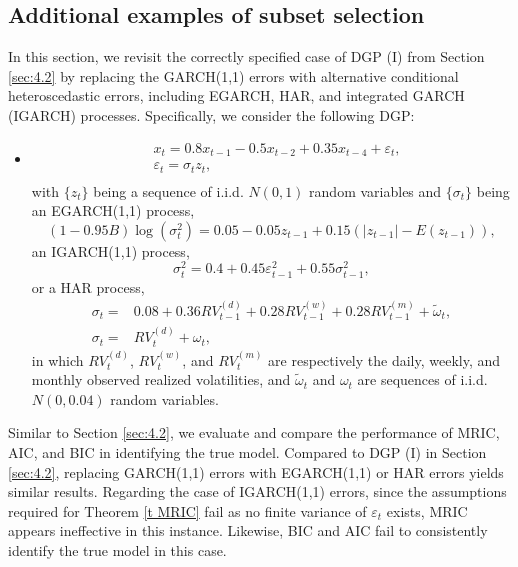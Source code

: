 \documentclass[ejsv2]{imsart}
\theoremstyle{plain}
\theoremstyle{definition}
\theoremstyle{remark}
\begin{document}
\subsection{Additional examples of subset selection}\label{sec:add sub sel}
In this section, we revisit the correctly specified case of DGP (I) from Section \ref{sec:4.2} by replacing the GARCH(1,1) errors with alternative conditional heteroscedastic errors, including EGARCH, HAR, and integrated GARCH (IGARCH) processes. Specifically, we consider the following DGP:
\begin{itemize}
  \item [(III)]
  \begin{equation*}%
\begin{split}
     & x_t=0.8x_{t-1}-0.5x_{t-2}+0.35x_{t-4}+\varepsilon_t, \\
     & \varepsilon_t=\sigma_tz_t,  \\
\end{split}
\end{equation*}
with $\{z_t\}$ being a sequence of
i.i.d. $N(0,1)$ random variables
and $\{\sigma_t\}$ being an EGARCH(1,1) process,
\begin{equation*}
(1-0.95B)\log(\sigma_t^2)=0.05-0.05z_{t-1}+0.15(|z_{t-1}|-E(z_{t-1})),
\end{equation*}
an IGARCH(1,1) process,
\begin{equation*}
\sigma_t^2=0.4+0.45\varepsilon_{t-1}^2+0.55\sigma_{t-1}^2,
\end{equation*}
or a HAR process,
\begin{equation*}
\begin{split}
   \sigma_t= & 0.08+0.36RV^{(d)}_{t-1}+0.28RV_{t-1}^{(w)}+0.28RV_{t-1}^{(m)}+\tilde{\omega}_{t}, \\
   \sigma_t= & RV^{(d)}_{t}+{\omega}_{t},
\end{split}
\end{equation*}
in which $RV^{(d)}_{t}$, $RV_{t}^{(w)}$, and $RV_{t}^{(m)}$ are respectively the daily, weekly, and monthly observed realized volatilities, and $\tilde{\omega}_{t}$ and ${\omega}_{t}$ are sequences of i.i.d. $N(0,0.04)$ random variables.
\end{itemize}

Similar to Section \ref{sec:4.2}, we evaluate and compare the performance of MRIC, AIC, and BIC in identifying the true model. Compared to DGP (I) in Section \ref{sec:4.2}, replacing GARCH(1,1) errors with EGARCH(1,1) or HAR errors yields similar results. Regarding the case of IGARCH(1,1) errors, since the assumptions required for Theorem \ref{t MRIC} fail as no finite variance of $\varepsilon_t$ exists, MRIC appears ineffective in this instance. Likewise, BIC and AIC fail to consistently identify the true model in this case. 
\end{document}
